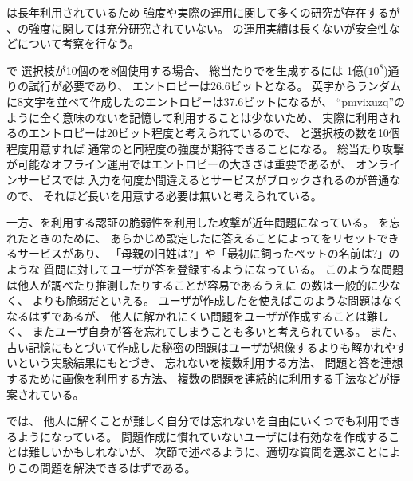 \documentclass[twoside]{wiss}
\begin{document}


{\PW}は長年利用されているため
強度や実際の運用に関して多くの研究が存在するが%
\cite{Hayashi:2011:DSP:1978942.1979326}%
\cite{Komanduri:2011:PPM:1978942.1979321}%
、{\SQ}の強度に関しては充分研究されていない。
{\EP}の運用実績は長くないが安全性などについて考察を行なう。

{\EP}で
選択枝が10個の{\SQ}を8個使用する場合、
総当たりで{\PW}を生成するには
1億($10^8$)通りの試行が必要であり、
エントロピーは26.6ビットとなる。
英字からランダムに8文字を並べて作成した{\PW}のエントロピーは37.6ビットになるが、
``\textsf{pmvixuzq}''のように全く意味のない{\PW}を記憶して利用することは少ないため、
実際に利用される{\PW}のエントロピーは20ビット程度と考えられているので\cite{NIST}、
{\SQ}と選択枝の数を10個程度用意すれば
通常の{\PW}と同程度の強度が期待できることになる。
%
総当たり攻撃が可能なオフライン運用ではエントロピーの大きさは重要であるが、
オンラインサービスでは
{\PW}入力を何度か間違えるとサービスがブロックされるのが普通なので、
それほど長い{\PW}を用意する必要は無いと考えられている\cite{Florencio:2007:SWP:1361419.1361429}。

一方、{\SQ}を利用する認証の脆弱性を利用した攻撃が近年問題になっている。
{\PW}を忘れたときのために、
あらかじめ設定した{\SQ}に答えることによって{\PW}をリセットできるサービスがあり、
「母親の旧姓は?」や「最初に飼ったペットの名前は?」のような
質問に対してユーザが答を登録するようになっている。
このような問題は他人が調べたり推測したりすることが容易であるうえに
{\SQ}の数は一般的に少なく、
{\PW}よりも脆弱だといえる\cite{Rabkin:2008:PKQ:1408664.1408667}。%
%
ユーザが作成した{\SQ}を使えばこのような問題はなくなるはずであるが、
他人に解かれにくい問題をユーザが作成することは難しく、
またユーザ自身が答を忘れてしまうことも多いと考えられている\cite{Just:2009:PCC:1572532.1572543}\cite{Schechter:2009:NSM:1607723.1608145}。
%
また、古い記憶にもとづいて作成した秘密の問題はユーザが想像するよりも解かれやすいという実験結果にもとづき、
忘れない{\SQ}を複数利用する方法、
問題と答を連想するために画像を利用する方法、
複数の問題を連続的に利用する手法などが提案されている\cite{Renaud:2010:PQE:2146303.2146318}。

{\EP}では、
他人に解くことが難しく自分では忘れない{\SQ}を自由にいくつでも利用できるようになっている。
問題作成に慣れていないユーザには有効な{\SQ}を作成することは難しいかもしれないが、
次節で述べるように、適切な質問を選ぶことによりこの問題を解決できるはずである。
\end{document}
